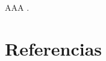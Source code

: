 \documentclass[12pt]{article}
\begin{document}
AAA \cite{DQNCart}.


\newpage

\section*{Referencias}
\renewcommand\refname{}


\end{document}
